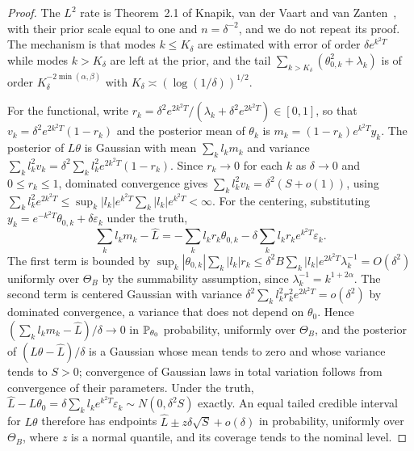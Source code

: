\begin{proof}
The $L^2$ rate is Theorem~2.1 of Knapik, van der Vaart and van Zanten~\cite{knapik2013}, with their prior scale equal to one and $n = \delta^{-2}$, and we do not repeat its proof. The mechanism is that modes $k\leq K_\delta$ are estimated with error of order $\delta e^{k^2T}$ while modes $k>K_\delta$ are left at the prior, and the tail $\sum_{k>K_\delta}(\theta_{0,k}^2+\lambda_k)$ is of order $K_\delta^{-2\min(\alpha,\beta)}$ with $K_\delta\asymp(\log(1/\delta))^{1/2}$.

For the functional, write $r_k = \delta^2e^{2k^2T}/(\lambda_k+\delta^2e^{2k^2T})\in[0,1]$, so that $v_k = \delta^2e^{2k^2T}(1-r_k)$ and the posterior mean of $\theta_k$ is $m_k = (1-r_k)e^{k^2T}y_k$. The posterior of $L\theta$ is Gaussian with mean $\sum_kl_km_k$ and variance $\sum_kl_k^2v_k = \delta^2\sum_kl_k^2e^{2k^2T}(1-r_k)$. Since $r_k\to0$ for each $k$ as $\delta\to0$ and $0\leq r_k\leq1$, dominated convergence gives $\sum_kl_k^2v_k = \delta^2(S+o(1))$, using $\sum_kl_k^2e^{2k^2T}\leq\sup_k|l_k|e^{k^2T}\sum_k|l_k|e^{k^2T}<\infty$. For the centering, substituting $y_k = e^{-k^2T}\theta_{0,k}+\delta\varepsilon_k$ under the truth,
\[
\sum_kl_km_k-\hat L = -\sum_kl_kr_k\theta_{0,k}-\delta\sum_kl_kr_ke^{k^2T}\varepsilon_k.
\]
The first term is bounded by $\sup_k|\theta_{0,k}|\sum_k|l_k|r_k\leq\delta^2B\sum_k|l_k|e^{2k^2T}\lambda_k^{-1} = O(\delta^2)$ uniformly over $\Theta_B$ by the summability assumption, since $\lambda_k^{-1} = k^{1+2\alpha}$. The second term is centered Gaussian with variance $\delta^2\sum_kl_k^2r_k^2e^{2k^2T} = o(\delta^2)$ by dominated convergence, a variance that does not depend on $\theta_0$. Hence $(\sum_kl_km_k-\hat L)/\delta\to0$ in $\P_{\theta_0}$ probability, uniformly over $\Theta_B$, and the posterior of $(L\theta-\hat L)/\delta$ is a Gaussian whose mean tends to zero and whose variance tends to $S>0$; convergence of Gaussian laws in total variation follows from convergence of their parameters. Under the truth, $\hat L-L\theta_0 = \delta\sum_kl_ke^{k^2T}\varepsilon_k\sim N(0,\delta^2S)$ exactly. An equal tailed credible interval for $L\theta$ therefore has endpoints $\hat L\pm z\delta\sqrt S+o(\delta)$ in probability, uniformly over $\Theta_B$, where $z$ is a normal quantile, and its coverage tends to the nominal level.
\end{proof}

